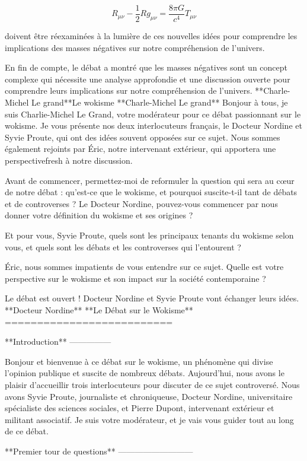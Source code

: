 $$R_{\mu\nu} - \frac{1}{2}Rg_{\mu\nu} = \frac{8\pi G}{c^4}T_{\mu\nu}$$

doivent être réexaminées à la lumière de ces nouvelles idées pour comprendre les implications des masses négatives sur notre compréhension de l'univers.

En fin de compte, le débat a montré que les masses négatives sont un concept complexe qui nécessite une analyse approfondie et une discussion ouverte pour comprendre leurs implications sur notre compréhension de l'univers.
**Charle-Michel Le grand**Le wokisme
**Charle-Michel Le grand**
Bonjour à tous, je suis Charlie-Michel Le Grand, votre modérateur pour ce débat passionnant sur le wokisme. Je vous présente nos deux interlocuteurs français, le Docteur Nordine et Syvie Proute, qui ont des idées souvent opposées sur ce sujet. Nous sommes également rejoints par Éric, notre intervenant extérieur, qui apportera une perspectivefresh à notre discussion.

Avant de commencer, permettez-moi de reformuler la question qui sera au cœur de notre débat : qu'est-ce que le wokisme, et pourquoi suscite-t-il tant de débats et de controverses ? Le Docteur Nordine, pouvez-vous commencer par nous donner votre définition du wokisme et ses origines ?

Et pour vous, Syvie Proute, quels sont les principaux tenants du wokisme selon vous, et quels sont les débats et les controverses qui l'entourent ?

Éric, nous sommes impatients de vous entendre sur ce sujet. Quelle est votre perspective sur le wokisme et son impact sur la société contemporaine ?

Le débat est ouvert !
Docteur Nordine et Syvie Proute vont échanger leurs idées.
**Docteur Nordine**
**Le Débat sur le Wokisme**
==========================

**Introduction**
---------------

Bonjour et bienvenue à ce débat sur le wokisme, un phénomène qui divise l'opinion publique et suscite de nombreux débats. Aujourd'hui, nous avons le plaisir d'accueillir trois interlocuteurs pour discuter de ce sujet controversé. Nous avons Syvie Proute, journaliste et chroniqueuse, Docteur Nordine, universitaire spécialiste des sciences sociales, et Pierre Dupont, intervenant extérieur et militant associatif. Je suis votre modérateur, et je vais vous guider tout au long de ce débat.

**Premier tour de questions**
---------------------------

